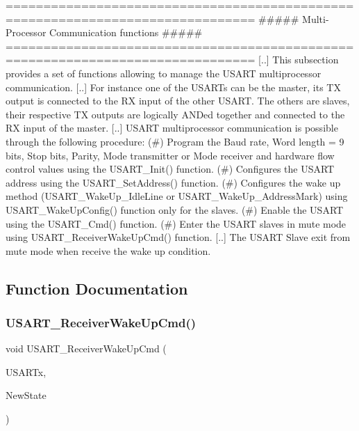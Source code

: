 \begin{DoxyVerb} ===============================================================================
              ##### Multi-Processor Communication functions #####
 ===============================================================================  
    [..]
    This subsection provides a set of functions allowing to manage the USART 
    multiprocessor communication.
    [..]
    For instance one of the USARTs can be the master, its TX output is connected 
    to the RX input of the other USART. The others are slaves, their respective 
    TX outputs are logically ANDed together and connected to the RX input of the 
    master.
    [..]
    USART multiprocessor communication is possible through the following procedure:
      (#) Program the Baud rate, Word length = 9 bits, Stop bits, Parity, Mode 
          transmitter or Mode receiver and hardware flow control values using 
          the USART_Init() function.
      (#) Configures the USART address using the USART_SetAddress() function.
      (#) Configures the wake up method (USART_WakeUp_IdleLine or USART_WakeUp_AddressMark)
          using USART_WakeUpConfig() function only for the slaves.
      (#) Enable the USART using the USART_Cmd() function.
      (#) Enter the USART slaves in mute mode using USART_ReceiverWakeUpCmd() function.
    [..]
    The USART Slave exit from mute mode when receive the wake up condition.\end{DoxyVerb}
 

\subsection{Function Documentation}
\mbox{\label{group___u_s_a_r_t___group3_gac27b78ce445a16fe33851d2f87781c02}} 
\subsubsection{\texorpdfstring{U\+S\+A\+R\+T\+\_\+\+Receiver\+Wake\+Up\+Cmd()}{USART\_ReceiverWakeUpCmd()}}
{\footnotesize\ttfamily void U\+S\+A\+R\+T\+\_\+\+Receiver\+Wake\+Up\+Cmd (\begin{DoxyParamCaption}\item[{U\+S\+A\+R\+T\+\_\+\+Type\+Def $\ast$}]{U\+S\+A\+R\+Tx,  }\item[{Functional\+State}]{New\+State }\end{DoxyParamCaption})}



